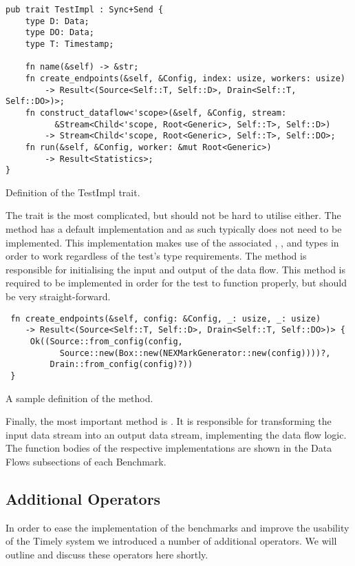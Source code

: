 \begin{listing}[H]
\begin{verbatim}
pub trait TestImpl : Sync+Send {
    type D: Data;
    type DO: Data;
    type T: Timestamp;

    fn name(&self) -> &str;
    fn create_endpoints(&self, &Config, index: usize, workers: usize)
        -> Result<(Source<Self::T, Self::D>, Drain<Self::T, Self::DO>)>;
    fn construct_dataflow<'scope>(&self, &Config, stream: 
          &Stream<Child<'scope, Root<Generic>, Self::T>, Self::D>)
        -> Stream<Child<'scope, Root<Generic>, Self::T>, Self::DO>;
    fn run(&self, &Config, worker: &mut Root<Generic>)
        -> Result<Statistics>;
}
\end{verbatim}
  \caption{Definition of the TestImpl trait.}
  \label{lst:testimpl-trait}
\end{listing}

The  trait is the most complicated, but should not be hard to utilise either. The  method has a default implementation and as such typically does not need to be implemented. This implementation makes use of the associated , , and  types in order to work regardless of the test's type requirements. The  method is responsible for initialising the input and output of the data flow. This method is required to be implemented in order for the test to function properly, but should be very straight-forward.

\begin{listing}[H]
\begin{verbatim}
 fn create_endpoints(&self, config: &Config, _: usize, _: usize)
    -> Result<(Source<Self::T, Self::D>, Drain<Self::T, Self::DO>)> {
     Ok((Source::from_config(config,
           Source::new(Box::new(NEXMarkGenerator::new(config))))?,
         Drain::from_config(config)?))
 }
\end{verbatim}
  \caption{A sample definition of the  method.}
  \label{lst:create-endpoints}
\end{listing}

Finally, the most important method is . It is responsible for transforming the input data stream into an output data stream, implementing the data flow logic. The function bodies of the respective  implementations are shown in the Data Flows subsections of each Benchmark.

\subsection{Additional Operators}
In order to ease the implementation of the benchmarks and improve the usability of the Timely system we introduced a number of additional operators. We will outline and discuss these operators here shortly.

